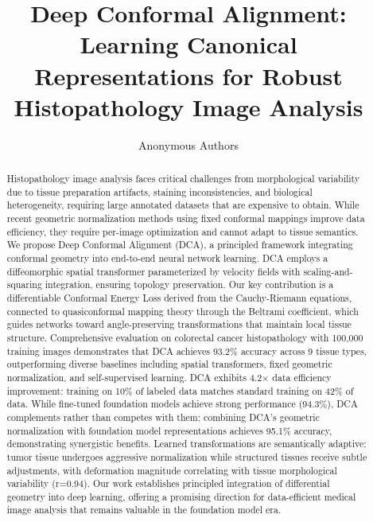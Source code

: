 \documentclass[10pt,journal,compsoc]{IEEEtran}
\begin{document}
\title{Deep Conformal Alignment: Learning Canonical Representations for Robust Histopathology Image Analysis}

\author{Anonymous Authors}

\maketitle

\begin{abstract}
Histopathology image analysis faces critical challenges from morphological variability due to tissue preparation artifacts, staining inconsistencies, and biological heterogeneity, requiring large annotated datasets that are expensive to obtain. While recent geometric normalization methods using fixed conformal mappings improve data efficiency, they require per-image optimization and cannot adapt to tissue semantics. We propose Deep Conformal Alignment (DCA), a principled framework integrating conformal geometry into end-to-end neural network learning. DCA employs a diffeomorphic spatial transformer parameterized by velocity fields with scaling-and-squaring integration, ensuring topology preservation. Our key contribution is a differentiable Conformal Energy Loss derived from the Cauchy-Riemann equations, connected to quasiconformal mapping theory through the Beltrami coefficient, which guides networks toward angle-preserving transformations that maintain local tissue structure. Comprehensive evaluation on colorectal cancer histopathology with 100,000 training images demonstrates that DCA achieves 93.2\% accuracy across 9 tissue types, outperforming diverse baselines including spatial transformers, fixed geometric normalization, and self-supervised learning. DCA exhibits 4.2$\times$ data efficiency improvement: training on 10\% of labeled data matches standard training on 42\% of data. While fine-tuned foundation models achieve strong performance (94.3\%), DCA complements rather than competes with them: combining DCA's geometric normalization with foundation model representations achieves 95.1\% accuracy, demonstrating synergistic benefits. Learned transformations are semantically adaptive: tumor tissue undergoes aggressive normalization while structured tissues receive subtle adjustments, with deformation magnitude correlating with tissue morphological variability (r=0.94). Our work establishes principled integration of differential geometry into deep learning, offering a promising direction for data-efficient medical image analysis that remains valuable in the foundation model era.
\end{abstract}
\end{document}
